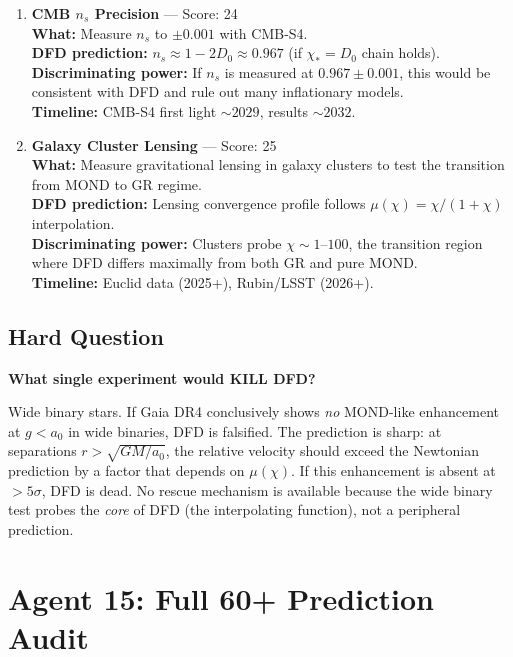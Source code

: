 \documentclass[11pt,a4paper]{article}
\begin{document}
\begin{enumerate}
\item[\textbf{\#4}] \textbf{CMB $n_s$ Precision} --- Score: 24\\
\textbf{What:} Measure $n_s$ to $\pm 0.001$ with CMB-S4.\\
\textbf{DFD prediction:} $n_s \approx 1 - 2D_0 \approx 0.967$ (if $\chi_* = D_0$ chain holds).\\
\textbf{Discriminating power:} If $n_s$ is measured at $0.967 \pm 0.001$, this would be consistent with DFD and rule out many inflationary models.\\
\textbf{Timeline:} CMB-S4 first light $\sim 2029$, results $\sim 2032$.

\item[\textbf{\#5}] \textbf{Galaxy Cluster Lensing} --- Score: 25\\
\textbf{What:} Measure gravitational lensing in galaxy clusters to test the transition from MOND to GR regime.\\
\textbf{DFD prediction:} Lensing convergence profile follows $\mu(\chi) = \chi/(1+\chi)$ interpolation.\\
\textbf{Discriminating power:} Clusters probe $\chi \sim 1$--$100$, the transition region where DFD differs maximally from both GR and pure MOND.\\
\textbf{Timeline:} Euclid data (2025+), Rubin/LSST (2026+).
\end{enumerate}

\subsection{Hard Question}

\textbf{What single experiment would KILL DFD?}

Wide binary stars. If Gaia DR4 conclusively shows \emph{no} MOND-like enhancement at $g < a_0$ in wide binaries, DFD is falsified. The prediction is sharp: at separations $r > \sqrt{GM/a_0}$, the relative velocity should exceed the Newtonian prediction by a factor that depends on $\mu(\chi)$. If this enhancement is absent at $> 5\sigma$, DFD is dead. No rescue mechanism is available because the wide binary test probes the \emph{core} of DFD (the interpolating function), not a peripheral prediction.

\newpage
\section{Agent 15: Full 60+ Prediction Audit}
\label{sec:agent15}
\end{document}

